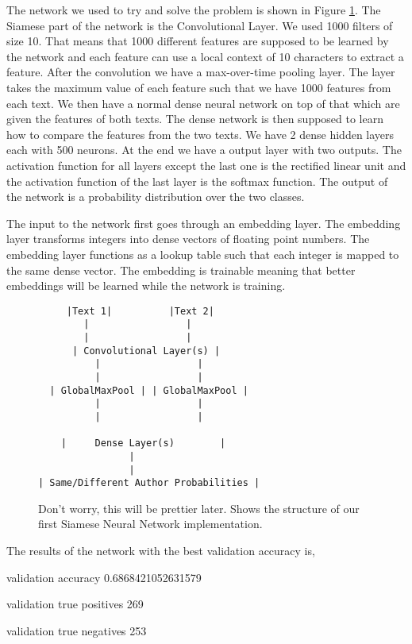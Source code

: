 The network we used to try and solve the problem is shown in Figure
\ref{fig:network_one}. The Siamese part of the network is the Convolutional
Layer. We used 1000 filters of size 10. That means that 1000 different features
are supposed to be learned by the network and each feature can use a local
context of 10 characters to extract a feature. After the convolution we have a
max-over-time pooling layer. The layer takes the maximum value of each feature
such that we have 1000 features from each text. We then have a normal dense
neural network on top of that which are given the features of both texts. The
dense network is then supposed to learn how to compare the features from the
two texts. We have 2 dense hidden layers each with 500 neurons. At the end we
have a output layer with two outputs. The activation function for all layers
except the last one is the rectified linear unit and the activation function of
the last layer is the softmax function. The output of the network is a
probability distribution over the two classes.

The input to the network first goes through an embedding layer. The embedding
layer transforms integers into dense vectors of floating point numbers. The
embedding layer functions as a lookup table such that each integer is mapped
to the same dense vector. The embedding is trainable meaning that better
embeddings will be learned while the network is training.

\begin{figure}[htb]
\begin{lstlisting}
     |Text 1|          |Text 2|
        |                 |
        |                 |
      | Convolutional Layer(s) |
          |                 |
          |                 |
  | GlobalMaxPool | | GlobalMaxPool |
          |                 |
          |                 |

    |     Dense Layer(s)        |
                |
                |
| Same/Different Author Probabilities |
\end{lstlisting}
\caption{Don't worry, this will be prettier later. Shows the structure of our
    first Siamese Neural Network implementation.}
\label{fig:network_one}
\end{figure}

The results of the network with the best validation accuracy is,

validation accuracy 0.6868421052631579

validation true positives 269

validation true negatives 253


